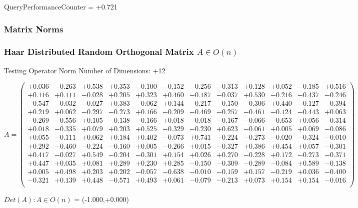 \documentclass[9pt]{article}
\theoremstyle{plain}
\theoremstyle{definition}
\theoremstyle{remark}
\numberwithin{equation}{section}
\begin{document}
QueryPerformanceCounter  =  +0.721
\subsubsection{Matrix Norms}
\subsubsection{Haar Distributed Random Orthogonal Matrix $A \in O(n)$}
 Testing Operator Norm
Number of Dimensions: +12

$A = \left(
\begin{array}{
cccccccccccc}
+0.036 & -0.263 & +0.538 & +0.353 & -0.100 & -0.152 & -0.256 & -0.313 & +0.128 & +0.052 & -0.185 & +0.516 \\
+0.116 & +0.111 & -0.028 & +0.205 & +0.323 & +0.460 & -0.187 & -0.037 & +0.530 & -0.216 & -0.437 & -0.246 \\
-0.547 & -0.032 & -0.027 & +0.383 & -0.062 & +0.144 & -0.217 & -0.150 & -0.306 & +0.440 & -0.127 & -0.394 \\
+0.219 & +0.062 & -0.297 & -0.273 & +0.166 & -0.209 & -0.469 & -0.257 & -0.461 & -0.124 & -0.443 & +0.063 \\
-0.269 & -0.556 & +0.105 & -0.138 & -0.166 & +0.018 & -0.018 & -0.167 & -0.066 & -0.653 & +0.056 & -0.314 \\
+0.018 & -0.335 & +0.079 & +0.203 & +0.525 & -0.329 & -0.230 & +0.623 & -0.061 & +0.005 & +0.069 & -0.086 \\
+0.055 & -0.111 & +0.062 & +0.184 & +0.402 & -0.073 & +0.741 & -0.224 & -0.273 & -0.020 & -0.324 & -0.010 \\
+0.292 & -0.460 & -0.224 & -0.160 & +0.005 & -0.266 & +0.015 & -0.327 & +0.386 & +0.454 & +0.057 & -0.301 \\
+0.417 & -0.027 & +0.549 & -0.204 & -0.301 & +0.154 & +0.026 & +0.270 & -0.228 & +0.172 & -0.273 & -0.371 \\
+0.447 & +0.035 & +0.081 & +0.289 & +0.230 & +0.285 & -0.150 & -0.309 & -0.289 & -0.084 & +0.589 & -0.138 \\
+0.005 & +0.498 & +0.203 & +0.202 & -0.057 & -0.638 & -0.010 & -0.159 & +0.157 & -0.219 & +0.036 & -0.400 \\
-0.321 & +0.139 & +0.448 & -0.571 & +0.493 & +0.061 & -0.079 & -0.213 & +0.073 & +0.154 & +0.154 & -0.016 \\
\end{array}
\right)$ \newline 

$Det(A) :   A \in O(n)$ = (-1.000,+0.000)
\end{document}
